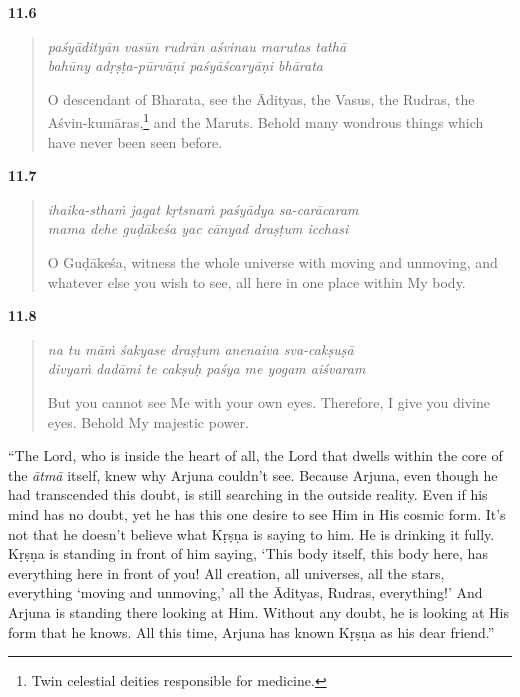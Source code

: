 \par\noindent\textbf{11.6}\par
\begin{verse}
\textit{paśyādityān vasūn rudrān aśvinau marutas tathā} \\
\textit{bahūny adṛṣṭa-pūrvāṇi paśyāścaryāṇi bhārata}

\noindent O descendant of Bharata, see the Ādityas, the Vasus, the Rudras, the Aśvin-kumāras,\footnote{Twin celestial deities responsible for medicine.} and the Maruts. Behold many wondrous things which have never been seen before.
\end{verse}
\par



\par\noindent\textbf{11.7}\par
\begin{verse}
\textit{ihaika-sthaṁ jagat kṛtsnaṁ paśyādya sa-carācaram} \\
\textit{mama dehe guḍākeśa yac cānyad draṣṭum icchasi}

\noindent O Guḍākeśa, witness the whole universe with moving and unmoving, and whatever else you wish to see, all here in one place within My body.
\end{verse}
\par



\par\noindent\textbf{11.8}\par
\begin{verse}
\textit{na tu māṁ śakyase draṣṭum anenaiva sva-cakṣuṣā} \\
\textit{divyaṁ dadāmi te cakṣuḥ paśya me yogam aiśvaram}

\noindent But you cannot see Me with your own eyes. Therefore, I give you divine eyes. Behold My majestic power.
\end{verse}
\par


\enquote{The Lord, who is inside the heart of all, the Lord that dwells within the core of the \textit{ātmā} itself, knew why Arjuna couldn’t see. Because Arjuna, even though he had transcended this doubt, is still searching in the outside reality. Even if his mind has no doubt, yet he has this one desire to see Him in His cosmic form. It’s not that he doesn’t believe what Kṛṣṇa is saying to him. He is drinking it fully. Kṛṣṇa is standing in front of him saying, \enquote{This body itself, this body here, has everything here in front of you! All creation, all universes, all the stars, everything ‘moving and unmoving,’ all the Ādityas, Rudras, everything!} And Arjuna is standing there looking at Him. Without any doubt, he is looking at His form that he knows. All this time, Arjuna has known Kṛṣṇa as his dear friend.}

